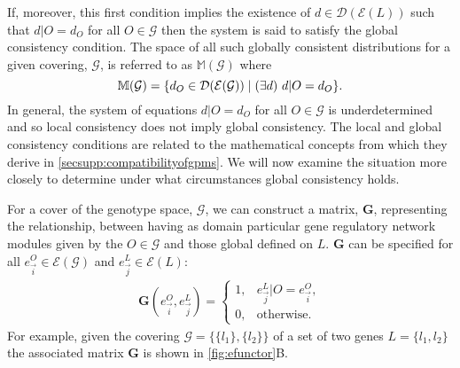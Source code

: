 If, moreover, this first condition implies the existence of $d \in \mathcal{D}( \mathcal{E}(L))$ such that $d|O = d_O$ for all $O \in \mathcal{G}$ then the system is said to satisfy the global consistency condition. The space of all such globally consistent distributions for a given covering, $\mathcal{G}$, is referred to as $\mathbb{M}(\mathcal{G})$ where
\begin{equation}
\mathbb{M}(\mathcal{G}) = \{ d_O \in \mathcal{D}{}(\mathcal{E}{}(\mathcal{G})) \mid (\exists d ) \,\, d|O = d_O \}.
\end{equation}
In general, the system of equations $d|O = d_O$ for all $O \in \mathcal{G}$ is underdetermined and so local consistency does not imply global consistency. The local and global consistency conditions are related to the mathematical concepts from which they derive in  \ref{secsupp:compatibilityofgpms}. We will now examine the situation more closely to determine under what circumstances global consistency holds.

For a cover of the genotype space, $\mathcal{G}$, we can construct a matrix, $\mathbf{G}$, representing the relationship,
between \gnpm{} having as domain particular gene regulatory network modules given by the $O \in \mathcal{G}$ and those global \gnpm{} defined on $L$.
$\mathbf{G}$ can be specified for all $e^O_{\vec{i}} \in \mathcal{E}(\mathcal{G})$ and $e^{L}_{\vec{j}} \in \mathcal{E}(L)$:
\begin{eqnarray}\label{eq:margmat}
\mathbf{G}(e^O_{\vec{i}},e^L_{\vec{j}}) =
\begin{cases}
1, & e^L_{\vec{j}}|O = e^O_{\vec{i}},\\
0, & \text{otherwise}.
\end{cases}
\end{eqnarray}
For example, given the covering $\mathcal{G} = \{ \{l_1\}, \{l_2\} \}$ of a set of two genes $L = \{ l_1, l_2 \}$ the associated matrix $\mathbf{G}$ is shown in \ref{fig:efunctor}B.

